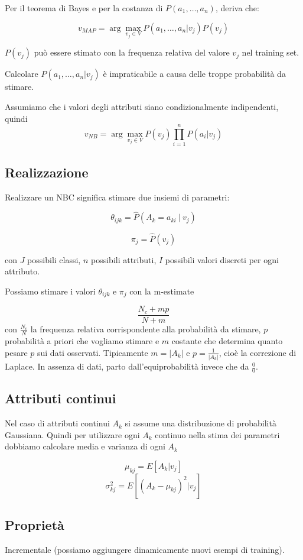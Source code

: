 \documentclass[11pt,onecolumn,a4paper,oneside]{book}
\begin{document}
Per il teorema di Bayes e per la costanza di $P( a_1, \dots, a_n )$, deriva che:

$$ v_{MAP} = \arg\max_{v_j \in V} P( a_1, \dots, a_n | v_j ) P(v_j) $$

$P(v_j)$ può essere stimato con la frequenza relativa del valore $v_j$ nel training set.

Calcolare $P( a_1, \dots, a_n | v_j )$ è impraticabile a causa delle troppe probabilità da stimare.

Assumiamo che i valori degli attributi siano condizionalmente indipendenti, quindi
$$v_{NB} = \arg\max_{v_j \in V} P(v_j)\prod_{i=1}^n P(a_i|v_j)$$

\subsection{Realizzazione}
Realizzare un NBC significa stimare due insiemi di parametri:

$$\theta_{ijk} = \hat P (A_k = a_{ki} ~ | ~ v_j ) $$

$$\pi_j = \hat P(v_j)$$

con $J$ possibili classi, $n$ possibili attributi, $I$ possibili valori discreti per ogni attributo.

Possiamo stimare i valori $\theta_{ijk}$ e $\pi_j$ con la m-estimate

$$\frac{N_c + mp}{N+m}$$
con $\frac{N_c}{N}$ la frequenza relativa corrispondente alla probabilità da stimare, $p$ probabilità a priori che vogliamo stimare e $m$ costante che determina quanto pesare $p$ sui dati osservati. Tipicamente $m=|A_k|$ e $p=\frac{1}{|A_k|}$, cioè la correzione di Laplace. In assenza di dati, parto dall'equiprobabilità invece che da $\frac{0}{0}$.

\subsection{Attributi continui}
Nel caso di attributi continui $A_k$ si assume una distribuzione di probabilità Gaussiana.
Quindi per utilizzare ogni $A_k$ continuo nella stima dei parametri dobbiamo calcolare media e varianza di ogni $A_k$

$$\mu_{kj} = E \left[ A_k | v_j \right]$$
$$\sigma^2_{kj} = E \left[ (A_k - \mu_{kj})^2 | v_j \right]$$

\subsection{Proprietà}
Incrementale (possiamo aggiungere dinamicamente nuovi esempi di training).
\end{document}

